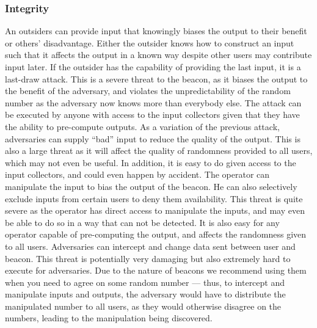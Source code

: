 \subsubsection{Integrity}

 An outsiders can provide input that knowingly biases the output to their benefit or others' disadvantage. Either the outsider knows how to construct an input such that it affects the output in a known way despite other users may contribute input later. If the outsider has the capability of providing the last input, it is a last-draw attack. This is a severe threat to the beacon, as it biases the output to the benefit of the adversary, and violates the unpredictability of the random number as the adversary now knows more than everybody else. The attack can be executed by anyone with access to the input collectors given that they have the ability to pre-compute outputs.
 As a variation of the previous attack, adversaries can supply \enquote{bad} input to reduce the quality of the output. This is also a large threat as it will affect the quality of randomness provided to all users, which may not even be useful. In addition, it is easy to do given access to the input collectors, and could even happen by accident.
 The operator can manipulate the input to bias the output of the beacon. He can also selectively exclude inputs from certain users to deny them availability. This threat is quite severe as the operator has direct access to manipulate the inputs, and may even be able to do so in a way that can not be detected. It is also easy for any operator capable of pre-computing the output, and affects the randomness given to all users.
 Adversaries can intercept and change data sent between user and beacon. This threat is potentially very damaging but also extremely hard to execute for adversaries. Due to the nature of beacons we recommend using them when you need to agree on some random number --- thus, to intercept and manipulate inputs and outputs, the adversary would have to distribute the manipulated number to all users, as they would otherwise disagree on the numbers, leading to the manipulation being discovered.
